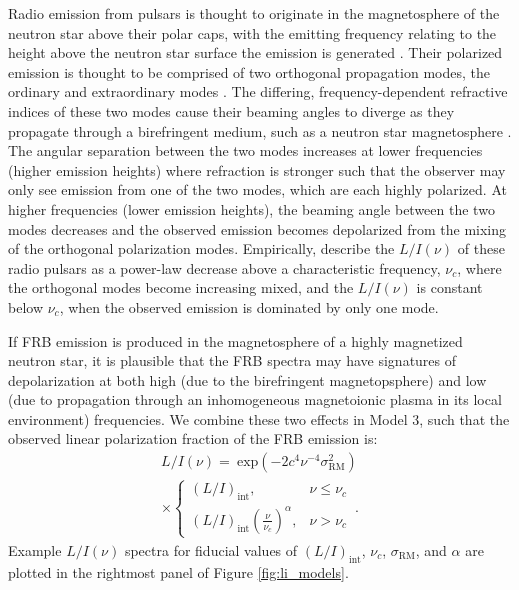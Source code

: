 \documentclass[twocolumn, linenumbers]{aastex701}
\begin{document}
Radio emission from pulsars is thought to originate in the magnetosphere of the neutron star above their polar caps, with the emitting frequency relating to the height above the neutron star surface the emission is generated \citep[sometimes referred to as ``radius-to-frequency mapping'';][]{1975ApJ...196...51R}. Their polarized emission is thought to be comprised of two orthogonal propagation modes, the ordinary and extraordinary modes \citep{1975ApJ...196...83M}. The differing, frequency-dependent refractive indices of these two modes cause their beaming angles to diverge as they propagate through a birefringent medium, such as a neutron star magnetosphere \citep{1986ApJ...302..138B}. The angular separation between the two modes increases at lower frequencies (higher emission heights) where refraction is stronger such that the observer may only see emission from one of the two modes, which are each highly polarized. At higher frequencies (lower emission heights), the beaming angle between the two modes decreases and the observed emission becomes depolarized from the mixing of the orthogonal polarization modes. Empirically, \cite{1973ApJ...179L...7M} describe the $L/I (\nu)$ of these radio pulsars as a power-law decrease above a characteristic frequency, $\nu_c$, where the orthogonal modes become increasing mixed, and the $L/I (\nu)$ is constant below $\nu_c$, when the observed emission is dominated by only one mode. 

If FRB emission is produced in the magnetosphere of a highly magnetized neutron star, it is plausible that the FRB spectra may have signatures of depolarization at both high (due to the birefringent magnetopsphere) and low (due to propagation through an inhomogeneous magnetoionic plasma in its local environment) frequencies. We combine these two effects in Model 3, such that the observed linear polarization fraction of the FRB emission is:
\begin{multline}
L/I (\nu) = ~\mathrm{exp} \left(-2 c^4 \nu^{-4} \sigma_\mathrm{RM}^2 \right)\\
\times
\begin{cases}
    (L/I)_\mathrm{int}, & \nu \leq \nu_c \\
    (L/I)_\mathrm{int} \left(\frac{\nu}{\nu_c}\right)^{\alpha}, & \nu > \nu_c 
\end{cases}
\,. \label{eq:model_3}
\end{multline}
Example $L/I (\nu)$ spectra for fiducial values of $(L/I)_\mathrm{int}$, $\nu_c$, $\sigma_\mathrm{RM}$, and $\alpha$ are plotted in the rightmost panel of Figure \ref{fig:li_models}.
\end{document}
